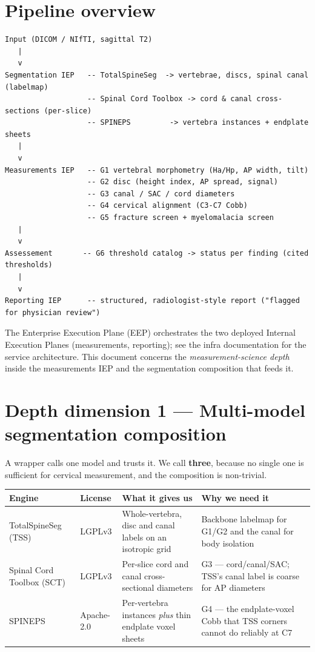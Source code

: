 \documentclass[11pt]{article}
\begin{document}
\section{Pipeline overview}
{\footnotesize
\begin{verbatim}
Input (DICOM / NIfTI, sagittal T2)
   |
   v
Segmentation IEP   -- TotalSpineSeg  -> vertebrae, discs, spinal canal (labelmap)
                   -- Spinal Cord Toolbox -> cord & canal cross-sections (per-slice)
                   -- SPINEPS         -> vertebra instances + endplate sheets
   |
   v
Measurements IEP   -- G1 vertebral morphometry (Ha/Hp, AP width, tilt)
                   -- G2 disc (height index, AP spread, signal)
                   -- G3 canal / SAC / cord diameters
                   -- G4 cervical alignment (C3-C7 Cobb)
                   -- G5 fracture screen + myelomalacia screen
   |
   v
Assessement       -- G6 threshold catalog -> status per finding (cited thresholds)
   |
   v
Reporting IEP      -- structured, radiologist-style report ("flagged for physician review")
\end{verbatim}
}

The Enterprise Execution Plane (EEP) orchestrates the two deployed Internal Execution Planes
(measurements, reporting); see the infra documentation for the service architecture. This document
concerns the \emph{measurement-science depth} inside the measurements IEP and the segmentation
composition that feeds it.

\section{Depth dimension 1 --- Multi-model segmentation composition}
A wrapper calls one model and trusts it. We call \textbf{three}, because no single one is sufficient for
cervical measurement, and the composition is non-trivial.

\begin{table}[h]
\centering\small
\begin{tabularx}{\textwidth}{@{}l l Y Y@{}}
\toprule
\textbf{Engine} & \textbf{License} & \textbf{What it gives us} & \textbf{Why we need it} \\
\midrule
TotalSpineSeg (TSS) & LGPLv3 & Whole-vertebra, disc and canal labels on an isotropic grid & Backbone
labelmap for G1/G2 and the canal for body isolation \\
Spinal Cord Toolbox (SCT) & LGPLv3 & Per-slice cord and canal cross-sectional diameters & G3 ---
cord/canal/SAC; TSS's canal label is coarse for AP diameters \\
SPINEPS & Apache-2.0 & Per-vertebra instances \emph{plus} thin endplate voxel sheets & G4 --- the
endplate-voxel Cobb that TSS corners cannot do reliably at C7 \\
\bottomrule
\end{tabularx}
\end{table}
\end{document}
